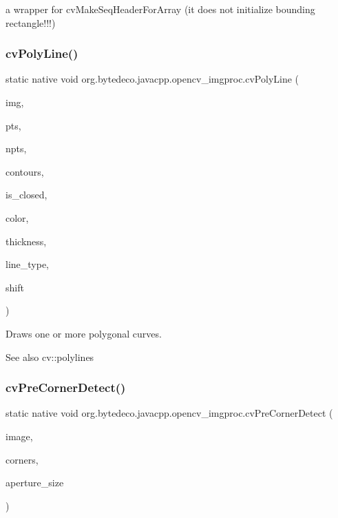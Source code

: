 a wrapper for cv\+Make\+Seq\+Header\+For\+Array (it does not initialize bounding rectangle!!!) \mbox{\label{group__imgproc__c_ga6e673e2e62b461c739fd8ac6fef9d226}} 
\subsubsection{\texorpdfstring{cv\+Poly\+Line()}{cvPolyLine()}}
{\footnotesize\ttfamily static native void org.\+bytedeco.\+javacpp.\+opencv\+\_\+imgproc.\+cv\+Poly\+Line (\begin{DoxyParamCaption}\item[{Cv\+Arr}]{img,  }\item[{@Cast(\char`\"{}Cv\+Point$\ast$$\ast$\char`\"{}) Pointer\+Pointer}]{pts,  }\item[{@Const Int\+Pointer}]{npts,  }\item[{int}]{contours,  }\item[{int}]{is\+\_\+closed,  }\item[{@By\+Val Cv\+Scalar}]{color,  }\item[{int}]{thickness,  }\item[{int}]{line\+\_\+type,  }\item[{int}]{shift }\end{DoxyParamCaption})\hspace{0.3cm}{\ttfamily [static]}}



Draws one or more polygonal curves. 

\begin{DoxySeeAlso}{See also}
cv\+::polylines 
\end{DoxySeeAlso}
\mbox{\label{group__imgproc__c_ga8412612edd153c979f48d7eab0f99cc7}} 
\subsubsection{\texorpdfstring{cv\+Pre\+Corner\+Detect()}{cvPreCornerDetect()}}
{\footnotesize\ttfamily static native void org.\+bytedeco.\+javacpp.\+opencv\+\_\+imgproc.\+cv\+Pre\+Corner\+Detect (\begin{DoxyParamCaption}\item[{@Const Cv\+Arr}]{image,  }\item[{Cv\+Arr}]{corners,  }\item[{int}]{aperture\+\_\+size }\end{DoxyParamCaption})\hspace{0.3cm}{\ttfamily [static]}}



